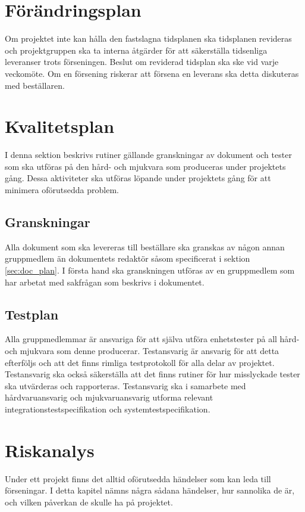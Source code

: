 \documentclass[a4paper,11pt]{article}
\begin{document}
\section{Förändringsplan}
Om projektet inte kan hålla den fastslagna tidsplanen ska tidsplanen revideras och projektgruppen ska ta interna åtgärder för att säkerställa tidsenliga leveranser trots förseningen. Beslut om reviderad tidsplan ska ske vid varje veckomöte. Om en försening riskerar att försena en leverans ska detta diskuteras med beställaren.

\section{Kvalitetsplan}
I denna sektion beskrivs rutiner gällande granskningar av dokument och tester som ska utföras på den hård- och mjukvara som produceras under projektets gång. Dessa aktiviteter ska utföras löpande under projektets gång för att minimera oförutsedda problem.

\subsection{Granskningar}
Alla dokument som ska levereras till beställare ska granskas av någon annan gruppmedlem än dokumentets redaktör såsom specificerat i sektion \ref{sec:doc_plan}. I första hand ska granskningen utföras av en gruppmedlem som har arbetat med sakfrågan som beskrivs i dokumentet.

\subsection{Testplan}
Alla gruppmedlemmar är ansvariga för att själva utföra enhetstester på all hård- och mjukvara som denne producerar. Testansvarig är ansvarig för att detta efterföljs och att det finns rimliga testprotokoll för alla delar av projektet. Testansvarig ska också säkerställa att det finns rutiner för hur misslyckade tester ska utvärderas och rapporteras. Testansvarig ska i samarbete med hårdvaruansvarig och mjukvaruansvarig utforma relevant integrationstestspecifikation och systemtestspecifikation.

\section{Riskanalys}
Under ett projekt finns det alltid oförutsedda händelser som kan leda till förseningar. I detta kapitel nämns några sådana händelser, hur sannolika de är, och vilken påverkan de skulle ha på projektet.
\end{document}
